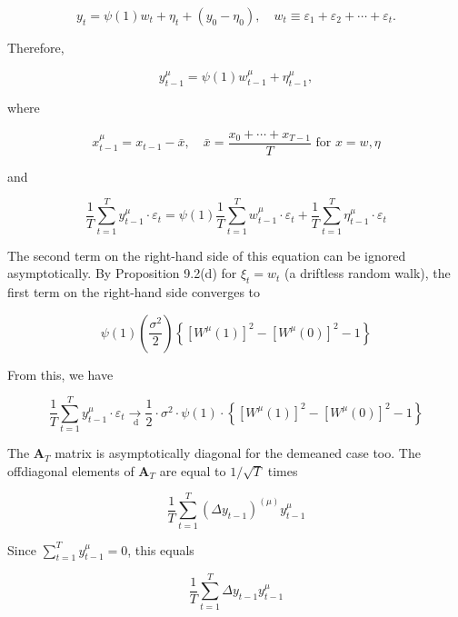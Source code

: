 \documentclass[10pt]{article}
\begin{document}
\begin{equation*}
y_{t}=\psi(1) w_{t}+\eta_{t}+\left(y_{0}-\eta_{0}\right), \quad w_{t} \equiv \varepsilon_{1}+\varepsilon_{2}+\cdots+\varepsilon_{t} . \tag{1}
\end{equation*}


Therefore,


\begin{equation*}
y_{t-1}^{\mu}=\psi(1) w_{t-1}^{\mu}+\eta_{t-1}^{\mu}, \tag{2}
\end{equation*}


where

$$
x_{t-1}^{\mu}=x_{t-1}-\bar{x}, \quad \bar{x}=\frac{x_{0}+\cdots+x_{T-1}}{T} \text { for } x=w, \eta
$$

and


\begin{equation*}
\frac{1}{T} \sum_{t=1}^{T} y_{t-1}^{\mu} \cdot \varepsilon_{t}=\psi(1) \frac{1}{T} \sum_{t=1}^{T} w_{t-1}^{\mu} \cdot \varepsilon_{t}+\frac{1}{T} \sum_{t=1}^{T} \eta_{t-1}^{\mu} \cdot \varepsilon_{t} \tag{3}
\end{equation*}


The second term on the right-hand side of this equation can be ignored asymptotically. By Proposition 9.2(d) for $\xi_{t}=w_{t}$ (a driftless random walk), the first term on the right-hand side converges to

$$
\psi(1)\left(\frac{\sigma^{2}}{2}\right)\left\{\left[W^{\mu}(1)\right]^{2}-\left[W^{\mu}(0)\right]^{2}-1\right\}
$$

From this, we have


\begin{equation*}
\frac{1}{T} \sum_{t=1}^{T} y_{t-1}^{\mu} \cdot \varepsilon_{t} \underset{\mathrm{~d}}{\rightarrow} \frac{1}{2} \cdot \sigma^{2} \cdot \psi(1) \cdot\left\{\left[W^{\mu}(1)\right]^{2}-\left[W^{\mu}(0)\right]^{2}-1\right\} \tag{4}
\end{equation*}


The $\mathbf{A}_{T}$ matrix is asymptotically diagonal for the demeaned case too. The offdiagonal elements of $\mathbf{A}_{T}$ are equal to $1 / \sqrt{T}$ times


\begin{equation*}
\frac{1}{T} \sum_{t=1}^{T}\left(\Delta y_{t-1}\right)^{(\mu)} y_{t-1}^{\mu} \tag{5}
\end{equation*}


Since $\sum_{t=1}^{T} y_{t-1}^{\mu}=0$, this equals


\begin{equation*}
\frac{1}{T} \sum_{t=1}^{T} \Delta y_{t-1} y_{t-1}^{\mu} \tag{6}
\end{equation*}
\end{document}
